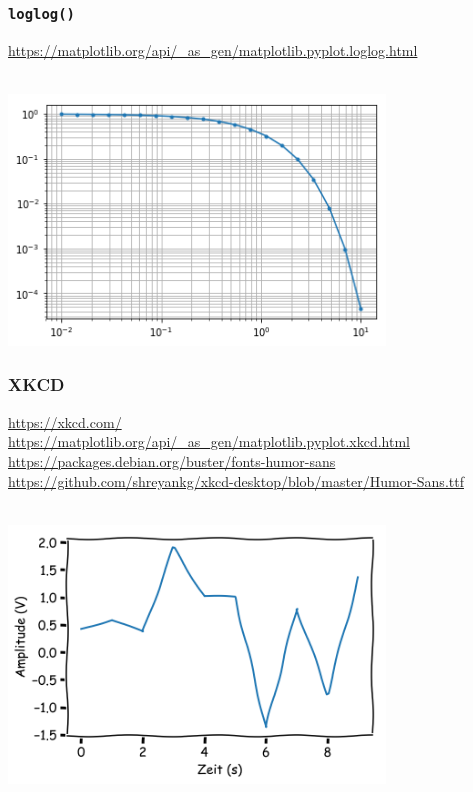 \subsubsection{\texttt{loglog()}}
\url{https://matplotlib.org/api/_as_gen/matplotlib.pyplot.loglog.html}\\
\begin{minipage}[t]{0.49\textwidth}
	
\end{minipage}
\hspace{0.02\textwidth}
\begin{minipage}[t]{0.49\textwidth}
	$\quad$\\[1pt]
	\includegraphics[width=0.75\textwidth]{images/v9_matplotlib4}
\end{minipage}




\subsubsection{XKCD}
\url{https://xkcd.com/}\\
\url{https://matplotlib.org/api/_as_gen/matplotlib.pyplot.xkcd.html}\\
\url{https://packages.debian.org/buster/fonts-humor-sans}\\
\url{https://github.com/shreyankg/xkcd-desktop/blob/master/Humor-Sans.ttf}\\
\begin{minipage}[t]{0.49\textwidth}
	
\end{minipage}
\hspace{0.02\textwidth}
\begin{minipage}[t]{0.49\textwidth}
	$\quad$\\[1pt]
	\includegraphics[width=0.75\textwidth]{images/v9_matplotlib5}
\end{minipage}

